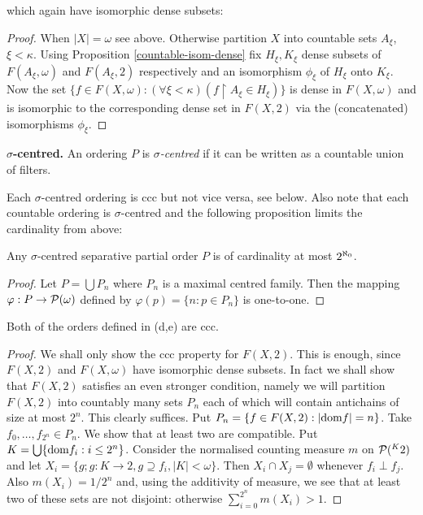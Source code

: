 which again have isomorphic dense subsets:

\begin{proof}
When $|X|=\omega$ see above. Otherwise partition $X$
into countable sets $A_\xi$, $\xi<\kappa$. Using Proposition \ref{countable-isom-dense}
fix $H_\xi, K_\xi$ dense subsets of $F(A_\xi,\omega)$
and $F(A_\xi,2)$ respectively and an isomorphism $\phi_\xi$ of $H_\xi$ onto $K_\xi$.
Now the set $\{f\in F(X,\omega):(\forall\xi<\kappa)(f\upharpoonright A_\xi\in H_\xi)\}$ is dense in $F(X,\omega)$ and
is isomorphic to the corresponding dense set in $F(X,2)$ via the (concatenated) isomorphisms $\phi_\xi$.
\end{proof}

\begin{definition}\label{sigma-centered}
{\bf {$\sigma$-centred.}} An ordering $P$ is \emph{$\sigma$-centred}
if it can be written as a countable union of filters.
\end{definition}

Each $\sigma$-centred ordering is ccc but not vice versa, see below. Also note that each countable ordering is $\sigma$-centred and the
following proposition limits the cardinality from above:

\begin{proposition}
Any $\sigma$-centred separative partial order $P$ is of cardinality at most ${2^{\aleph_0}}$.
\end{proposition}

\begin{proof}
Let $P=\bigcup P_n$ where $P_n$ is a maximal centred family. Then the mapping $\varphi:P\to{{\mathcal P}}(\omega)$ defined by $\varphi(p)=\{n:p\in P_n\}$ is
one-to-one.
\end{proof}


\begin{proposition}
 Both of the orders defined in (d,e) are ccc.
\end{proposition}


\begin{proof}
We shall only show the ccc property for $F(X,2)$. This is enough, since $F(X,2)$ and $F(X,\omega)$ have isomorphic dense subsets.
In fact we shall show that $F(X,2)$ satisfies an even stronger condition, %
namely we will partition $F(X,2)$ into countably many sets $P_n$ each of which will contain
antichains of size at most $2^n$. This clearly suffices. Put $P_n=\{f\in F(X,2):|\hbox{dom} f|=n\}$. Take $f_0,\ldots,f_{2^n}\in P_n$.
We show that at least two are compatible. Put $K=\bigcup\{\hbox{dom} f_i:i\leq2^n\}$. Consider the normalised counting measure $m$ on ${{\mathcal P}}( ^K2)$ and let $X_i=\{g;g:K\to2,g\supseteq f_i,|K|<\omega\}$. Then $X_i\cap X_j=\emptyset$ whenever $f_i\perp f_j$. Also $m(X_i)=1/2^n$ and, using the additivity
of measure, we see that at least two of these sets are not disjoint: otherwise $\sum_{i=0}^{2^n} m(X_i) > 1$.
\end{proof}

